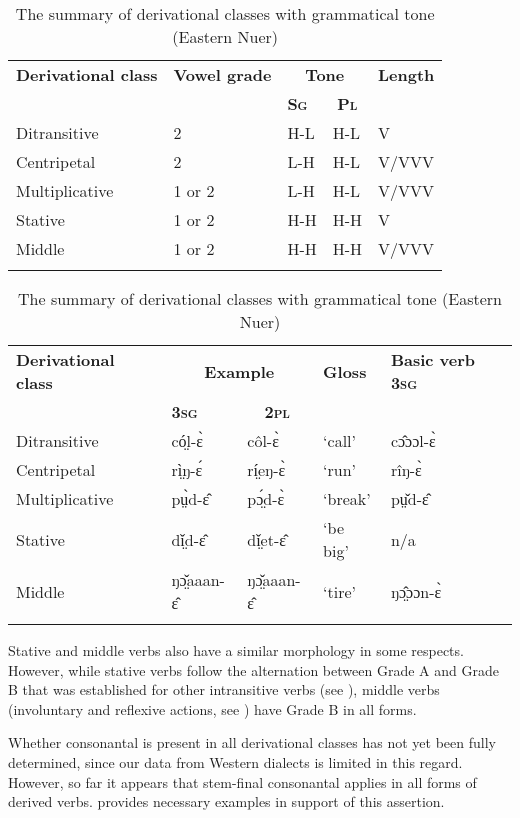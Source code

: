 \documentclass[output=paper,newtxmath,modfonts,nonflat,draftmode]{langsci/langscibook}
\begin{document}
\begin{table}
\begin{tabularx}{\textwidth}{p{45mm}p{30mm}@{}Xll}
\lsptoprule

\bfseries Derivational class & \bfseries Vowel grade & \multicolumn{2}{c}{\bfseries Tone} & {\bfseries Length}\\
&  & \bfseries\scshape Sg & \multicolumn{1}{c}{\bfseries\scshape Pl} &\\
\midrule
Ditransitive & 2 & H-L & H-L & V\\
Centripetal & 2 & L-H & H-L & V/VVV\\
Multiplicative & 1 or 2 & L-H & H-L & V/VVV\\
Stative & 1 or 2 & H-H & H-H & V\\
Middle & 1 or 2 & H-H & H-H & V/VVV\\
\lspbottomrule
\end{tabularx}
\begin{tabularx}{\textwidth}{p{45mm}llll}
\bfseries Derivational class & \multicolumn{2}{c}{\bfseries Example} & \bfseries Gloss & {\bfseries Basic  verb 3\textsc{sg}} \\
& \bfseries\scshape 3sg & \multicolumn{1}{c}{\bfseries\scshape 2pl} &  & \\
\midrule
Ditransitive & có̤l-ɛ̀ & côl-ɛ̀ & ‘call’ & cɔ̂ɔɔl-ɛ̀\\
Centripetal & rì̤ŋ-ɛ́ & rí̤eŋ-ɛ̀& ‘run’ & rîŋ-ɛ̀\\
Multiplicative & pṳ̀d-ɛ̂ & pɔ̤́d-ɛ̀ & ‘break’ & pṳ̌d-ɛ̂\\
Stative & dǐ̤d-ɛ̂ & dǐ̤et-ɛ̂ & ‘be big’ & n/a\\
Middle & ŋɔ̤̌aaan-ɛ̂ & ŋɔ̤̌aaan-ɛ̂ & ‘tire’ & ŋɔ̤̂ɔɔn-ɛ̀\\
\lspbottomrule
\end{tabularx}
\caption{The summary of derivational classes with grammatical tone (Eastern Nuer)}
\label{tab:monich:15}
\end{table}

Stative and middle verbs also have a similar morphology in some respects. However, while stative verbs follow the alternation between Grade A and Grade B that was established for other intransitive verbs (see ), middle verbs (involuntary and reflexive actions, see ) have Grade B in all forms.

Whether consonantal  is present in all derivational classes has not yet been fully determined, since our data from Western  dialects is limited in this regard. However, so far it appears that stem-final consonantal  applies in all forms of derived verbs.  provides necessary examples in support of this assertion. 
\end{document}
